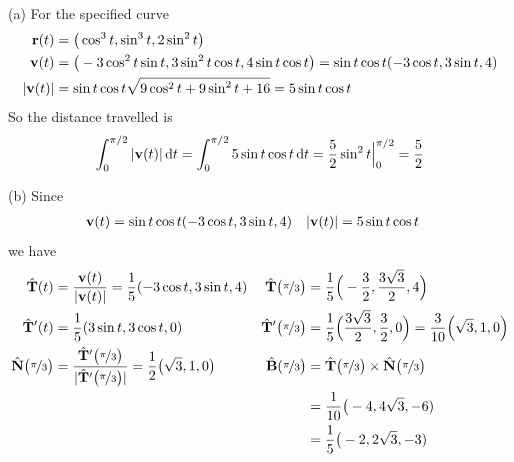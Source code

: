 \begin{solution}
(a)  For the specified curve
\begin{align*}
\mathbf{r}(t)&=\big(\cos^3t,\sin^3t,2\sin^2t\big)\\
\mathbf{v}(t)&=\big(-3\cos^2t\sin t,3\sin^2t\cos t,4\sin t\cos t\big)
=\sin t\cos t (-3\cos t,3\sin t, 4)\\
|\mathbf{v}(t)|&=\sin t\cos t\sqrt{9\cos^2t+9\sin^2t+16}=5\sin t\cos t
\end{align*}
So the distance travelled is 
\begin{equation*}
\int_0^{\pi/2}|\mathbf{v}(t)|\,\mathrm{d}t=\int_0^{\pi/2} 5\sin t\cos t\,\mathrm{d}t = \frac{5}{2}\sin^2t\Big|_0^{\pi/2}
=\frac{5}{2}
\end{equation*}

(b) Since
\begin{align*}
\mathbf{v}(t)&=\sin t\cos t (-3\cos t,3\sin t, 4) &
|\mathbf{v}(t)|&=5\sin t\cos t
\end{align*}
we have
\begin{align*}
\hat{\mathbf{T}}(t) &= \frac{\mathbf{v}(t)}{|\mathbf{v}(t)|} 
           =\frac{1}{5}(-3\cos t,3\sin t, 4) &
\hat{\mathbf{T}}\big(\nicefrac{\pi}{3}\big)
           &=\frac{1}{5}\Big(-\frac{3}{2},\frac{3\sqrt{3}}{2}, 4\Big) \\
\hat{\mathbf{T}}'(t) &=\frac{1}{5}(3\sin t,3\cos t, 0) &
\hat{\mathbf{T}}'\big(\nicefrac{\pi}{3}\big)
           &=\frac{1}{5}\Big(\frac{3\sqrt{3}}{2}, \frac{3}{2}, 0\Big)
            = \frac{3}{10} \Big(\sqrt{3}, 1, 0\Big)\\
\hat{\mathbf{N}}\big(\nicefrac{\pi}{3}\big) &= \frac{\hat{\mathbf{T}}'\big(\nicefrac{\pi}{3}\big)}
                                     {|\hat{\mathbf{T}}'\big(\nicefrac{\pi}{3}\big)|}
                  =\frac{1}{2}\big(\sqrt{3},1,0\big) &
\hat{\mathbf{B}}(\nicefrac{\pi}{3}\big)
&= \hat{\mathbf{T}}\big(\nicefrac{\pi}{3}\big)\times
             \hat{\mathbf{N}}\big(\nicefrac{\pi}{3}\big) \\
& & &=\frac{1}{10}\big(-4,4\sqrt{3},-6) \\
& & &=\frac{1}{5}\big(-2,2\sqrt{3},-3) 
\end{align*}
\end{solution}


